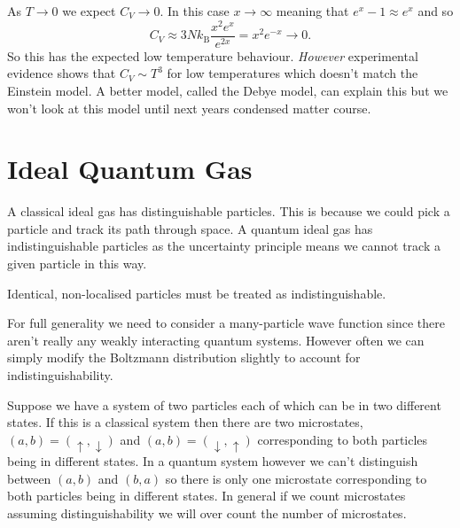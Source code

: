 \documentclass[a4paper]{article}
\newcommand{\boltzmann}{k_\mathrm{B}}
\newcounter{keypointcounter}
\newenvironment{keypoint}{%
    \stepcounter{keypointcounter}
    \begin{tcolorbox}[breakable, title=Key Point \thekeypointcounter]
}{%
    \end{tcolorbox}
}
\begin{document}
    As \(T\to 0\) we expect \(C_V \to 0\).
    In this case \(x \to \infty\) meaning that \(e^x - 1 \approx e^x\) and so
    \[C_V \approx 3N\boltzmann \frac{x^2 e^x}{e^{2x}} = x^2e^{-x} \to 0.\]
    So this has the expected low temperature behaviour.
    \emph{However} experimental evidence shows that \(C_V\sim T^{3}\) for low temperatures which doesn't match the Einstein model.
    A better model, called the Debye model, can explain this but we won't look at this model until next years condensed matter course.
    
    \section{Ideal Quantum Gas}
    A classical ideal gas has distinguishable particles.
    This is because we could pick a particle and track its path through space.
    A quantum ideal gas has indistinguishable particles as the uncertainty principle means we cannot track a given particle in this way.
    \begin{keypoint}
        Identical, non-localised particles must be treated as indistinguishable.
    \end{keypoint}
    For full generality we need to consider a many-particle wave function since there aren't really any weakly interacting quantum systems.
    However often we can simply modify the Boltzmann distribution slightly to account for indistinguishability.
    
    Suppose we have a system of two particles each of which can be in two different states.
    If this is a classical system then there are two microstates, \((a, b) = (\uparrow, \downarrow)\) and \((a, b) = (\downarrow, \uparrow)\) corresponding to both particles being in different states.
    In a quantum system however we can't distinguish between \((a, b)\) and \((b, a)\) so there is only one microstate corresponding to both particles being in different states.
    In general if we count microstates assuming distinguishability we will over count the number of microstates.
    
\end{document}

